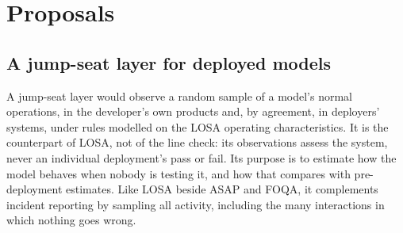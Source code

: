 \documentclass[11pt]{article}
\begin{document}
\section{Proposals}\label{sec:proposals}

\subsection{A jump-seat layer for deployed models}\label{sec:jumpseat}

A jump-seat layer would observe a random sample of a model's normal operations, in the developer's own products and, by agreement, in deployers' systems, under rules modelled on the LOSA operating characteristics. It is the counterpart of LOSA, not of the line check: its observations assess the system, never an individual deployment's pass or fail. Its purpose is to estimate how the model behaves when nobody is testing it, and how that compares with pre-deployment estimates. Like LOSA beside ASAP and FOQA, it complements incident reporting by sampling all activity, including the many interactions in which nothing goes wrong.
\end{document}
